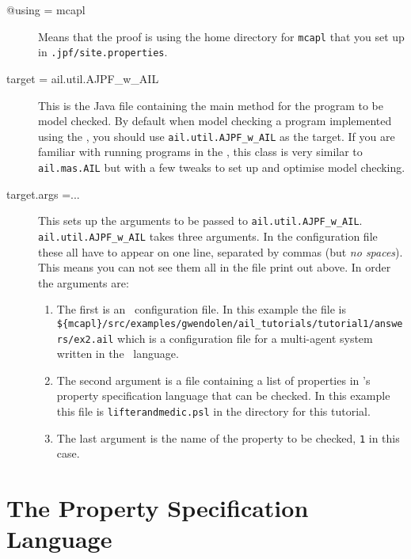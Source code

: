 \begin{sloppypar}
\begin{description}
\item[@using = mcapl] Means that the proof is using the home directory for \texttt{mcapl} that you set up in \texttt{.jpf/site.properties}.
\item[target = ail.util.AJPF\_w\_AIL] This is the Java file containing the main method for the program to be model checked.  By default when model checking a program implemented using the \ail, you should use \texttt{ail.util.AJPF\_w\_AIL} as the target.  If you are familiar with running programs in the \ail, this class is very similar to \texttt{ail.mas.AIL} but with a few tweaks to set up and optimise model checking.
\item[target.args =...] This sets up the arguments to be passed to \texttt{ail.util.AJPF\_w\_AIL}.  \texttt{ail.util.AJPF\_w\_AIL} takes three arguments.  In the configuration file these all have to appear on one line, separated by commas (but \emph{no spaces}).  This means you can not see them all in the file print out above.  In order the arguments are:
\begin{enumerate}
\item The first is an \ail\ configuration  file.  In this example the file is \texttt{\$\{mcapl\}/src/examples/gwendolen/ail\_tutorials/tutorial1/answers/ex2.ail} which is a configuration file for a multi-agent system written in the \gwendolen\ language.
\item The second argument is a file containing a list of properties in \ajpf's property specification language that can be checked.  In this example this file is \texttt{lifterandmedic.psl} in the directory for this tutorial.
\item The last argument is the name of the property to be checked, \texttt{1} in this case.
\end{enumerate}
\end{description}
\end{sloppypar}

\section{The Property Specification Language}

